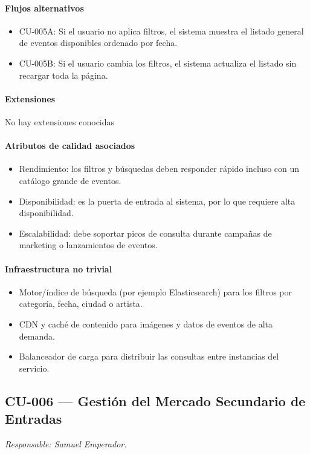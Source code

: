 \paragraph{Flujos alternativos}
\begin{itemize}[leftmargin=1.4em, topsep=1pt]
  \item CU-005A: Si el usuario no aplica filtros, el sistema muestra el listado general de eventos disponibles ordenado por fecha.
  \item CU-005B: Si el usuario cambia los filtros, el sistema actualiza el listado sin recargar toda la página.
\end{itemize}

\paragraph{Extensiones}
No hay extensiones conocidas

\paragraph{Atributos de calidad asociados}
\begin{itemize}[leftmargin=1.4em, topsep=1pt]
  \item Rendimiento: los filtros y búsquedas deben responder rápido incluso con un catálogo grande de eventos.
  \item Disponibilidad: es la puerta de entrada al sistema, por lo que requiere alta disponibilidad.
  \item Escalabilidad: debe soportar picos de consulta durante campañas de marketing o lanzamientos de eventos.
\end{itemize}

\paragraph{Infraestructura no trivial}
\begin{itemize}[leftmargin=1.4em, topsep=1pt]
  \item Motor/índice de búsqueda (por ejemplo Elasticsearch) para los filtros por categoría, fecha, ciudad o artista.
  \item CDN y caché de contenido para imágenes y datos de eventos de alta demanda.
  \item Balanceador de carga para distribuir las consultas entre instancias del servicio.
\end{itemize}

\subsection{CU-006 --- Gestión del Mercado Secundario de Entradas}
\label{cu:cu-006}
\textit{Responsable: Samuel Emperador.}

